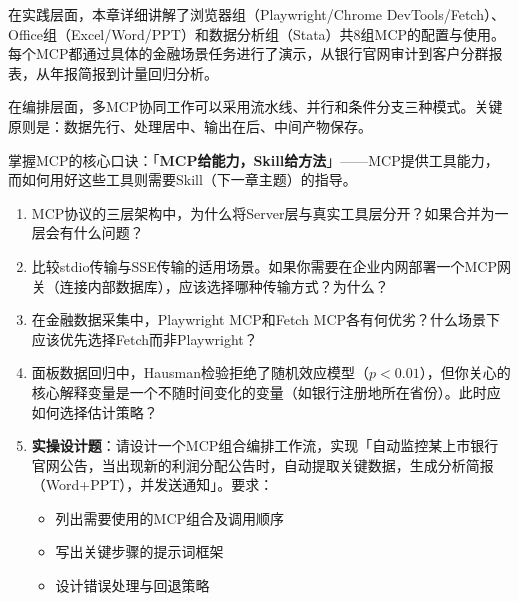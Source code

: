 在实践层面，本章详细讲解了浏览器组（Playwright/Chrome DevTools/Fetch）、Office组（Excel/Word/PPT）和数据分析组（Stata）共8组MCP的配置与使用。每个MCP都通过具体的金融场景任务进行了演示，从银行官网审计到客户分群报表，从年报简报到计量回归分析。

在编排层面，多MCP协同工作可以采用流水线、并行和条件分支三种模式。关键原则是：数据先行、处理居中、输出在后、中间产物保存。

掌握MCP的核心口诀：「\textbf{MCP给能力，Skill给方法}」——MCP提供工具能力，而如何用好这些工具则需要Skill（下一章主题）的指导。




\begin{exercisebox}[思考题]
\begin{enumerate}[leftmargin=2em]
  \item MCP协议的三层架构中，为什么将Server层与真实工具层分开？如果合并为一层会有什么问题？
  \item 比较stdio传输与SSE传输的适用场景。如果你需要在企业内网部署一个MCP网关（连接内部数据库），应该选择哪种传输方式？为什么？
  \item 在金融数据采集中，Playwright MCP和Fetch MCP各有何优劣？什么场景下应该优先选择Fetch而非Playwright？
  \item 面板数据回归中，Hausman检验拒绝了随机效应模型（$p < 0.01$），但你关心的核心解释变量是一个不随时间变化的变量（如银行注册地所在省份）。此时应如何选择估计策略？
  \item \textbf{实操设计题}：请设计一个MCP组合编排工作流，实现「自动监控某上市银行官网公告，当出现新的利润分配公告时，自动提取关键数据，生成分析简报（Word+PPT），并发送通知」。要求：
  \begin{itemize}
    \item 列出需要使用的MCP组合及调用顺序
    \item 写出关键步骤的提示词框架
    \item 设计错误处理与回退策略
  \end{itemize}
\end{enumerate}
\end{exercisebox}

